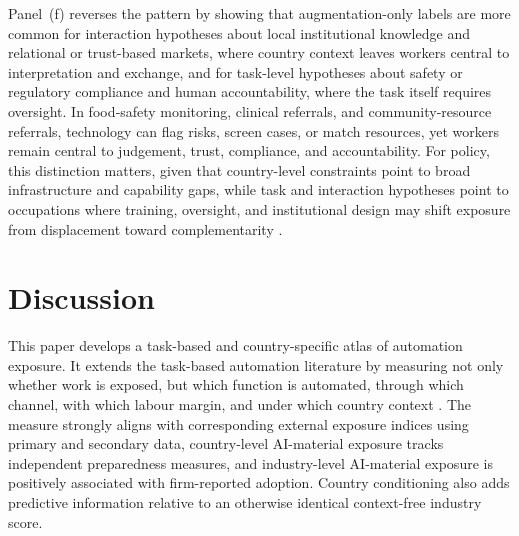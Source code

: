 \documentclass[11pt]{article}
\begin{document}
Panel~(f) reverses the pattern by showing that augmentation-only labels are more common for interaction hypotheses about local institutional knowledge and relational or trust-based markets, where country context leaves workers central to interpretation and exchange, and for task-level hypotheses about safety or regulatory compliance and human accountability, where the task itself requires oversight. In food‑safety monitoring, clinical referrals, and community‑resource referrals, technology can flag risks, screen cases, or match resources, yet workers remain central to judgement, trust, compliance, and accountability. For policy, this distinction matters, given that country-level constraints point to broad infrastructure and capability gaps, while task and interaction hypotheses point to occupations where training, oversight, and institutional design may shift exposure from displacement toward complementarity \citep{RaischKrakowski2021AutomationAugmentation,VaccaroAlmaatouqMalone2024HumanAIUseful}.


\section{Discussion}
\label{sec:discussion}

This paper develops a task-based and country-specific atlas of automation exposure. It extends the task-based automation literature by measuring not only whether work is exposed, but which function is automated, through which channel, with which labour margin, and under which country context \citep{AutorLevyMurnane2003,AcemogluRestrepo2018,Restrepo2024AutomationOutlook}. The measure strongly aligns with corresponding external exposure indices using primary and secondary data, country-level AI-material exposure tracks independent preparedness measures, and industry-level AI-material exposure is positively associated with firm-reported adoption. Country conditioning also adds predictive information relative to an otherwise identical context-free industry score.
\end{document}
